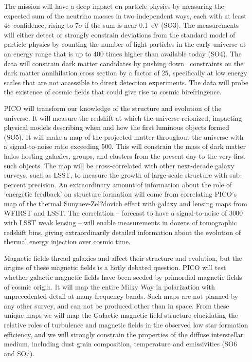 \documentclass[PICOReport.tex]{subfiles}
\begin{document}
The mission will have a deep impact on particle physics by measuring the expected sum of the neutrino masses in two independent ways, each with at least $4\sigma$ confidence, rising to $7\sigma$ if the sum is near 0.1~eV (SO3).  The measurements will either detect or strongly constrain deviations from the standard model of particle physics by counting the number of light particles in the early universe at an energy range that is up to 400 times higher than available today  (SO4). The data will constrain dark matter candidates by pushing down \planck\ constraints on the dark matter annihilation cross section by a factor of 25, specifically at low energy scales that are not accessible to direct detection experiments. The data will probe the existence of cosmic fields that could give rise to cosmic birefringence. 

PICO will transform our knowledge of the structure and evolution of the universe. It will measure the redshift at which the universe reionized, impacting physical models describing when and how the first luminous objects formed (SO5).  It will make a map of the projected matter throughout the universe with a signal-to-noise ratio exceeding 500. This will constrain the mass of dark matter halos hosting galaxies, groups, and clusters from the present day to the very first such objects.  The map will be cross-correlated with other next-decade galaxy surveys, such as LSST, to measure the growth of large-scale structure with sub-percent precision.  An extraordinary amount of information about the role of 'energetic feedback' on structure formation will come from correlating PICO's map of the thermal Sunyaev-Zel?dovich effect with galaxy and lensing maps from WFIRST and LSST. The correlation -- forecast to have a signal-to-noise of 3000 with LSST weak lensing -- will enable measurements in dozens of tomographic redshift bins, giving extraordinarily detailed information about the evolution of thermal energy injection over cosmic time.

Magnetic fields thread galaxies and affect their structure and evolution, but the origins of these magnetic fields is a hotly debated question. PICO will test whether galactic magnetic fields have been seeded by primordial magnetic fields of cosmic origin. It will map the entire Milky Way in polarization with unprecedented detail at many frequency bands. Such maps are not planned by any other survey, and can not be produced other than in space.  From these unique maps we will map the Galactic magnetic field structure elucidating the relative roles of turbulence and magnetic fields in the observed low star formation efficiency, and we will strongly constrain the properties of the diffuse interstellar medium, including dust grain composition, temperature and emissivities (SO6 and SO7).
\end{document}
